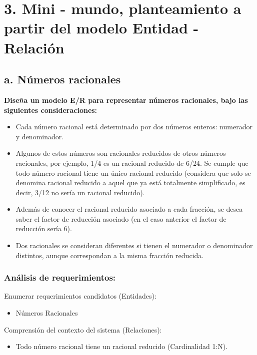 

\section*{3. Mini - mundo, planteamiento a partir del modelo Entidad - Relación}

\subsection*{a. Números racionales}


\textbf{Diseña un modelo E/R para representar números racionales, bajo las siguientes consideraciones:}

\begin{itemize}
\item Cada número racional está determinado por dos números enteros: numerador y denominador.
\item Algunos de estos números son racionales reducidos de otros números racionales, por ejemplo, 1/4 es un racional reducido de 6/24. Se cumple que todo número racional tiene un único racional reducido (considera que solo se denomina racional reducido a aquel que ya está totalmente simplificado, es decir, 3/12 no sería un racional reducido).
\item Además de conocer el racional reducido asociado a cada fracción, se desea saber el factor de reducción asociado (en el caso anterior el factor de reducción sería 6).
\item Dos racionales se consideran diferentes si tienen el numerador o denominador distintos, aunque correspondan a la misma fracción reducida.
\end{itemize}
\subsubsection*{Análisis de requerimientos:}

Enumerar requerimientos candidatos (Entidades):
\begin{itemize}
\item Números Racionales
\end{itemize}

Comprensión del contexto del sistema (Relaciones):
\begin{itemize}
\item Todo número racional tiene un racional reducido (Cardinalidad 1:N).
\end{itemize}

